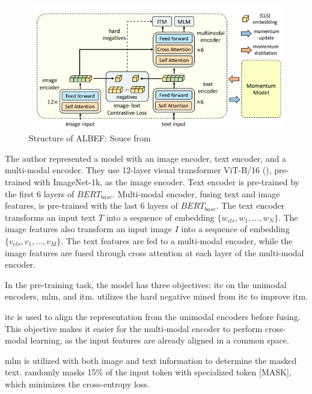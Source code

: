 \begin{figure}[htbp]
    \begin{center}
        \includegraphics[width=\linewidth]{img/albef_model_structure.png}
        \caption{Structure of ALBEF: Souce from \cite{li2021align}}
        \label{fig:albef}
    \end{center}
\end{figure}

The author represented a model with an image encoder, text encoder, and a multi-modal encoder. They use 12-layer visual transformer ViT-B/16 (\cite{dosovitskiy2021image}), pre-trained with ImageNet-1k, as the image encoder. 
Text encoder is pre-trained by the first 6 layers of $BERT_{base}$. Multi-modal encoder, fusing text and image features, is pre-trained with the last 6 layers of $BERT_{base}$.
The text encoder transforms an input text $T$ into a sequence of embedding $\{w_{cls}, w_1, ..., w_N\}$. The image features also transform an input image $I$ into a sequence of embedding $\{v_{cls}, v_1, ..., v_M\}$. The text features are fed to a multi-modal encoder, while the image features are fused through cross attention at each layer of the multi-modal encoder.

In the pre-training task, the model has three objectives: \acrfull{itc} on the unimodal encoders, \acrfull{mlm}, and \acrfull{itm}.
\cite{li2021align} utilizes the hard negative mined from \acrshort{itc} to improve \acrshort{itm}.


\acrshort{itc} is used to align the representation from the unimodal encoders before fusing. This objective makes it easier for the multi-modal encoder to perform cross-modal learning, as the input features are already aligned in a common space. 

\acrshort{mlm} is utilized with both image and text information to determine the masked text. \cite{li2021align} randomly masks 15\% of the input token with specialized token [MASK], which minimizes the cross-entropy loss.

